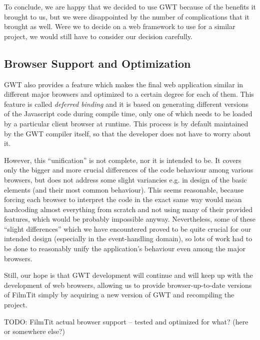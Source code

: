 To conclude, we are happy that we decided to use GWT because of the benefits it brought to us, but we were disappointed by the number of complications that it brought as well. Were we to decide on a web framework to use for a similar project, we would still have to consider our decision carefully.

\subsection{Browser Support and Optimization}
GWT also provides a feature which makes the final web application similar in different major browsers and optimized to a certain degree for each of them. This feature is called {\em deferred binding} and it is based on generating different versions of the Javascript code during compile time, only one of which needs to be loaded by a particular client browser at runtime. This process is by default maintained by the GWT compiler itself, so that the developer does not have to worry about it.

However, this ``unification'' is not complete, nor it is intended to be. It covers only the bigger and more crucial differences of the code behaviour among various browsers, but does not address some slight variancies e.g. in design of the basic elements (and their most common behaviour). This seems reasonable, because forcing each browser to interpret the code in the exact same way would mean hardcoding almost everything from scratch and not using many of their provided features, which would be probably impossible anyway. Nevertheless, some of these ``slight differences'' which we have encountered proved to be quite crucial for our intended design (especially in the event-handling domain), so lots of work had to be done to reasonably unify the application's behaviour even among the major browsers.

Still, our hope is that GWT development will continue and will keep up with the development of web browsers, allowing us to provide browser-up-to-date versions of FilmTit simply by acquiring a new version of GWT and recompiling the project.

TODO: FilmTit actual browser support -- tested and optimized for what? (here or somewhere else?)

